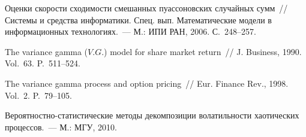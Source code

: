 \begin{multicols}{2}
{{\begin{thebibliography}{99}
  Оценки скорости
сходимости смешанных пуассоновских случайных сумм~// 
Системы и средства информатики. Спец. вып. Математические модели в информационных технологиях.~--- М.: ИПИ РАН,
2006. С.~248--257.

  The variance gamma ($V.G.$)
model for share market return~// J. Business, 1990. Vol.~63. P.~511--524.

  The variance gamma
process and option pricing~// Eur. Finance Rev., 1998. Vol.~2. P.~79--105.

 \label{end\stat}

  Ве\-ро\-ят\-ност\-но-ста\-ти\-сти\-че\-ские методы
декомпозиции волатильности хаотических процессов.~--- М.: МГУ, 2010.
 \end{thebibliography}
}
}


\end{multicols}  